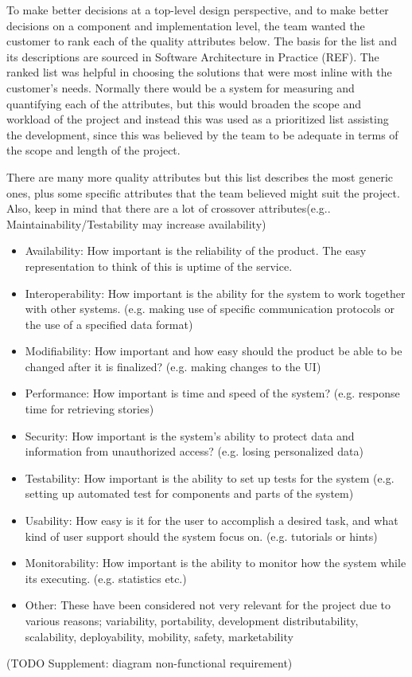 To make better decisions at a top-level design perspective, and to make better decisions on a component and implementation level, the team wanted the customer to rank each of the quality attributes below. The basis for the list and its descriptions are sourced in Software Architecture in Practice (REF). The ranked list was helpful in choosing the solutions that were most inline with the customer’s needs. Normally there would be a system for measuring and quantifying each of the attributes, but this would broaden the scope and workload of the project and instead this was used as a prioritized list assisting the development, since this was believed by the team to be adequate in terms of the scope and length of the project.\newline

There are many more quality attributes but this list describes the most generic ones, plus some specific attributes that the team believed might suit the project. Also, keep in mind that there are a lot of crossover attributes(e.g.. Maintainability/Testability may increase availability)\newline
\begin{itemize}
\item Availability: How important is the reliability of the product. The easy representation to think of this is uptime of the service.
\item Interoperability: How important is the ability for the system to work together with other systems. (e.g. making use of specific communication protocols or the use of a specified data format)
\item Modifiability: How important and how easy should the product be able to be changed after it is finalized? (e.g. making changes to the UI)
\item Performance: How important is time and speed of the system? (e.g. response time for retrieving stories)
\item Security: How important is the system’s ability to protect data and information from unauthorized access? (e.g. losing personalized data)
\item Testability: How important is the ability to set up tests for the system (e.g. setting up automated test for components and parts of the system)
\item Usability: How easy is it for the user to accomplish a desired task, and what kind of user support should the system focus on. (e.g. tutorials or hints)
\item Monitorability: How important is the ability to monitor how the system while its executing. (e.g. statistics etc.)
\item Other: These have been considered not very relevant for the project due to various reasons; variability, portability, development distributability, scalability, deployability, mobility, safety, marketability
\end{itemize}

(TODO Supplement: diagram non-functional requirement)

\cleardoublepage

